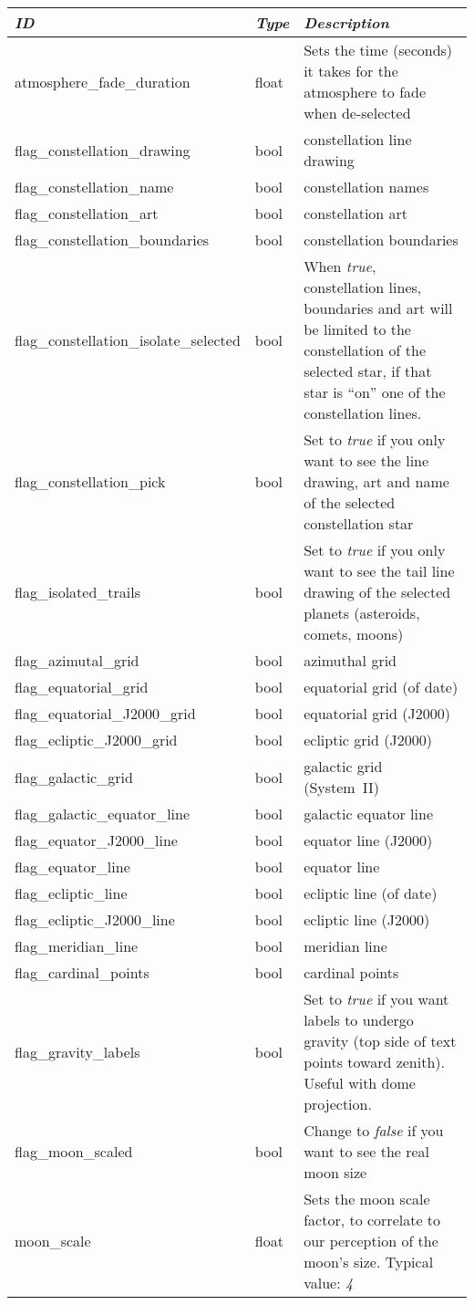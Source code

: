 \begin{longtabu} to \textwidth {l|l|X}
\toprule
\emph{ID} & \emph{Type} & \emph{Description}\tabularnewline
\midrule
atmosphere\_fade\_duration & float & Sets the time (seconds) it takes for the atmosphere to fade when de-selected\tabularnewline
\midrule
flag\_constellation\_drawing & bool & constellation line drawing\tabularnewline
\midrule
flag\_constellation\_name & bool & constellation names\tabularnewline
\midrule
flag\_constellation\_art & bool & constellation art\tabularnewline
\midrule
flag\_constellation\_boundaries & bool & constellation boundaries \tabularnewline
\midrule
flag\_constellation\_isolate\_selected & bool & When \emph{true}, constellation lines, boundaries and art will be limited to the constellation of the selected star, if that star is ``on'' one of the constellation lines.\tabularnewline
\midrule
flag\_constellation\_pick & bool & Set to \emph{true} if you only want to see the line drawing, art and name of the selected constellation star\tabularnewline
\midrule
flag\_isolated\_trails & bool & Set to \emph{true} if you only want to see the tail line drawing of the selected planets (asteroids, comets, moons)\tabularnewline
\midrule
flag\_azimutal\_grid & bool & azimuthal grid \tabularnewline
\midrule
flag\_equatorial\_grid & bool & equatorial grid (of date) \tabularnewline
\midrule
flag\_equatorial\_J2000\_grid & bool & equatorial grid (J2000) \tabularnewline
\midrule
flag\_ecliptic\_J2000\_grid & bool & ecliptic grid (J2000) \tabularnewline
\midrule
flag\_galactic\_grid & bool & galactic grid (System~II)\tabularnewline
\midrule
flag\_galactic\_equator\_line & bool & galactic equator line \tabularnewline
\midrule
flag\_equator\_J2000\_line & bool & equator line (J2000) \tabularnewline
\midrule
flag\_equator\_line & bool & equator line \tabularnewline
\midrule
flag\_ecliptic\_line & bool & ecliptic line (of date) \tabularnewline
\midrule
flag\_ecliptic\_J2000\_line & bool & ecliptic line (J2000) \tabularnewline
\midrule
flag\_meridian\_line & bool & meridian line \tabularnewline
\midrule
flag\_cardinal\_points & bool & cardinal points\tabularnewline
\midrule
flag\_gravity\_labels & bool & Set to \emph{true} if you want labels to undergo gravity (top side of text points toward zenith). Useful with dome projection.\tabularnewline
\midrule
flag\_moon\_scaled & bool & Change to \emph{false} if you want to see the real moon size \tabularnewline
\midrule
moon\_scale & float & Sets the moon scale factor, to correlate to our perception of the moon's size. Typical value: \emph{4}\tabularnewline
\midrule

\end{longtabu}
